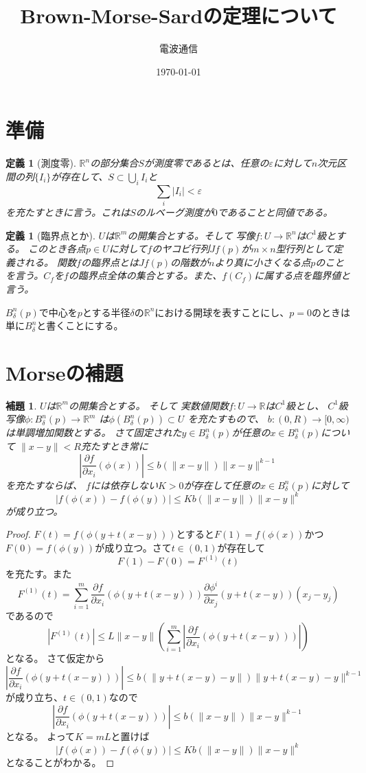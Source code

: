 \documentclass[leqno]{jsarticle}
\title{Brown-Morse-Sardの定理について}
\author{電波通信}
\date{\today}
\newtheorem{lem}[thm]{補題}
\newtheorem{df}[thm]{定義}
\newcommand{\rr}{\mathbb{R}}
\newcommand{\ep}{\varepsilon}
\begin{document}
\maketitle

\section{準備}

\begin{df}[測度零]
$\rr^n$の部分集合$S$が測度零であるとは、任意の$\ep$に対して$n$次元区間の列$\{I_i\}$が存在して、$S\subset \bigcup_{i}I_i$と
\[
\sum_{i}|I_i|<\ep
\]
を充たすときに言う。これは$S$のルベーグ測度が$0$であることと同値である。
\end{df}

\begin{df}[臨界点とか]$U$は$\rr^m$の開集合とする。そして
写像$f:U\to \rr^n$は$C^1$級とする。
このとき各点$p\in U$に対して$f$のヤコビ行列$Jf(p)$が$m\times n$型行列として定義される。
関数$f$の臨界点とは$Jf(p)$の階数が$n$より真に小さくなる点$p$のことを言う。$C_f$を$f$の臨界点全体の集合とする。また、$f(C_f)$に属する点を臨界値と言う。
\end{df}
$B_{\delta}^n(p)$で中心を$p$とする半径$\delta$の$\rr^n$における開球を表すことにし、$p=0$のときは単に$B_{\delta}^{n}$と書くことにする。
\section{Morseの補題}
\begin{lem}\label{ori}
$U$は$\rr^m$の開集合とする。
そして
実数値関数$f:U\to \rr$は$C^1$級とし、
$C^1$級写像$\phi:B_{\delta}^{n}(p)\to \rr^m$
は$\phi(B_{\delta}^{n}(p))\subset U$
を充たすもので、
$b:(0,R)\to [0,\infty)$は単調増加関数とする。
さて固定された$y\in B_{\delta}^{n}(p)$が任意の$x\in B_{\delta}^{n}(p)$について
$\|x-y\|<R$充たすとき常に
\[
\left|\frac{\partial f}{\partial x_i}(\phi(x))\right|\le b(\|x-y\|)\|x-y\|^{k-1}
\]
を充たすならば、
$f$には依存しない$K>0$が存在して任意の$x\in B_{\delta}^{n}(p)$に対して
\[
|f(\phi(x))-f(\phi(y))|\le Kb(\|x-y\|)\|x-y\|^{k}
\]
が成り立つ。
\end{lem}
\begin{proof}
$F(t)=f(\phi(y+t(x-y)))$とすると$F(1)=f(\phi(x))$かつ$F(0)=f(\phi(y))$が成り立つ。さて$t\in (0,1)$が存在して
\[
F(1)-F(0)=F^{(1)}(t)
\]
を充たす。また
\[
F^{(1)}(t)=\sum_{i=1}^m \frac{\partial f}{\partial x_i}(\phi(y+t(x-y)))\frac{\partial \phi^i}{\partial x_j}(y+t(x-y))(x_j-y_j)
\]
であるので
\[
|F^{(1)}(t)|\le L\lVert x-y\rVert\left(\sum_{i=1}^m\left|\frac{\partial f}{\partial x_i}(\phi(y+t(x-y))) \right|\right)
\]
となる。
さて仮定から
\[
\left|\frac{\partial f}{\partial x_i}(\phi(y+t(x-y))) \right|\le b(\lVert y+t(x-y)-y\rVert)\lVert y+t(x-y)-y\rVert^{k-1}
\]
が成り立ち、$t\in (0,1)$なので
\[
\left|\frac{\partial f}{\partial x_i}(\phi(y+t(x-y))) \right|\le b(\lVert x-y\rVert)\lVert x-y\rVert^{k-1}
\]
となる。
よって$K=mL$と置けば
\[
|f(\phi(x))-f(\phi(y))|\le Kb(\|x-y\|)\|x-y\|^{k}
\]
となることがわかる。
\end{proof}
\end{document}
